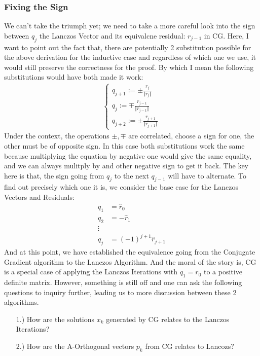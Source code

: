\documentclass[]{article}
\theoremstyle{definition}
\begin{document}
        \subsubsection{Fixing the Sign}
            We can't take the triumph yet; we need to take a more careful look into the sign between $q_j$ the Lanczos Vector and its equivalcne residual: $r_{j - 1}$ in CG. Here, I want to point out the fact that, there are potentially 2 substitution possible for the above derivation for the inductive case and regardless of which one we use, it would still preserve the correctness for the proof. By which I mean the following substitutions would have both made it work: 
            \begin{align}
                \begin{cases}
                    q_{j + 1} := \pm \frac{r_j}{\Vert r_j\Vert}
                    \\
                    q_{j} := \mp \frac{r_{j - 1}}{\Vert r_{j - 1}\Vert}
                    \\
                    q_{j + 2} := \pm \frac{r_{j + 1}}{\Vert r_{j + 1}\Vert}
                \end{cases}
            \end{align}
            Under the context, the operations $\pm, \mp$ are correlated, choose a sign for one, the other must be of opposite sign. In this case both substitutions work the same because multiplying the equation by negative one would give the same equality, and we can always mulitply by and other negative sign to get it back. The key here is that, the sign going from $q_{j}$ to the next $q_{j - 1}$ will have to alternate. To find out precisely which one it is, we consider the base case for the Lanczos Vectors and Residuals: 
            \begin{align}
                q_1 &= \hat r_0\\
                q_2 &= -\hat r_1
                \\
                \vdots
                \\
                q_j &= (-1)^{j + 1}\hat r_{j + 1}
            \end{align}
            And at this point, we have established the equivalence going from the Conjugate Gradient algorithm to the Lanczos Algorithm. And the moral of the story is, CG is a special case of applying the Lanczos Iterations with $q_1 = r_0$ to a positive definite matrix. However, something is still off and one can ask the following questions to inquiry further, leading us to more discussion between these 2 algorithms. 
            \begin{enumerate}
                \item [1.)] How are the solutions $x_k$ generated by CG relates to the Lanczos Iterations? 
                \item [2.)] How are the A-Orthogonal vectors $p_k$ from CG relates to Lancozs? 
            \end{enumerate}
\end{document}
